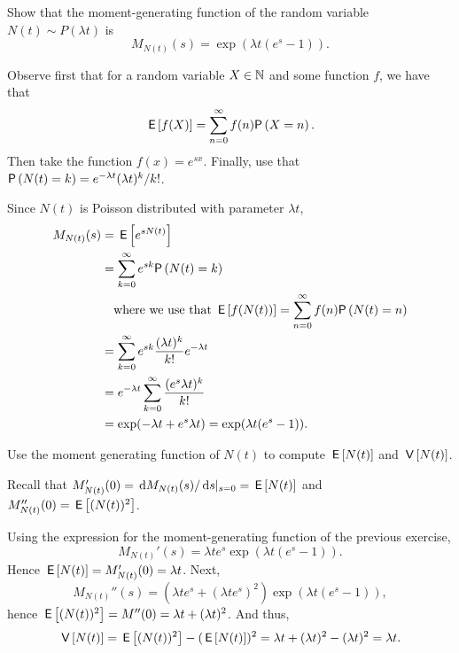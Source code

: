 \begin{exercise}
Show that the moment-generating function of the random variable~$N(t)\sim P(\lambda t)$ is
\begin{equation*}
M_{N(t)}(s) 
= \exp{(\lambda t(e^s-1))}.
\end{equation*}
  \begin{hint}Observe first that for a random variable $X\in\mathbb{N}$ and some function $f$, we have that
    \begin{equation*}
\E{f(X)}=\sum_{n=0}^\infty f(n) \P{X=n}.      
    \end{equation*}
Then take the function $f(x)=e^{s x}$. Finally, use that $\P{N(t)=k}=e^{-\lambda t}(\lambda t)^k/k!$.
  \end{hint}
\begin{solution}
Since $N(t)$ is Poisson distributed with parameter $\lambda t$, 
\begin{align*}
M_{N(t)}(s)
&=  \E{e^{s N(t)}} \\
&= \sum_{k=0}^\infty e^{s k} \P{N(t)=k} \\
&\quad\text{where we use that $\E{f(N(t))}=\sum_{n=0}^\infty f(n) \P{N(t)=n}$}\\
&= \sum_{k=0}^\infty e^{s k} \frac{(\lambda t)^k}{k!} e^{-\lambda t}  \\
&= e^{-\lambda t} \sum_{k=0}^\infty  \frac{(e^s \lambda t)^k}{k!}  \\
&= \exp(-\lambda t + e^s \lambda t) =\exp(\lambda t(e^s - 1)).
\end{align*}
\end{solution}
\end{exercise}

\begin{exercise}
Use  the moment generating function of $N(t)$ to compute $\,\mathsf{E}\left[N(t)\right]$ and $\,\mathsf{V}\left[N(t)\right]$. 
\begin{hint}
  Recall that $M_{N(t)}'(0) = \,\text{d}M_{N(t)}(s)/\,\text{d}s|_{s=0} = \,\mathsf{E}\left[N(t)\right]$ and $M_{N(t)}''(0)= \,\mathsf{E}\left[(N(t))^2\right]$. 
\end{hint}
\begin{solution}
Using the expression for the moment-generating function of the previous exercise,
  \begin{equation*}
    M_{N(t)}'(s) = \lambda t e^s \exp(\lambda t(e^s - 1)).
  \end{equation*}
Hence $\,\mathsf{E}\left[N(t)\right] = M_{N(t)}'(0) = \lambda t $. Next, 
  \begin{equation*}
    M_{N(t)}''(s) = (\lambda t e^s + (\lambda t e^s)^2) \exp(\lambda t(e^s - 1)),
  \end{equation*}
hence $\,\mathsf{E}\left[(N(t))^2\right] = M''(0) = \lambda t + (\lambda t)^2$. And thus, 
\begin{equation*}
\,\mathsf{V}\left[N(t)\right] =\,\mathsf{E}\left[(N(t))^2\right]-(\,\mathsf{E}\left[N(t)\right])^2 = \lambda t + (\lambda t)^2 - (\lambda t)^2 = \lambda t.
\end{equation*}
\end{solution}
\end{exercise}

